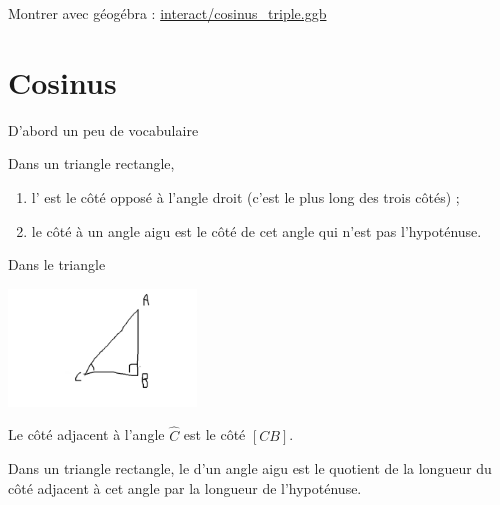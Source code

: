


Montrer avec géogébra : \url{interact/cosinus_triple.ggb}

\section{Cosinus}

D'abord un peu de vocabulaire

\begin{definition}
Dans un triangle rectangle,
\begin{enumerate}
    \item
        l' est le côté opposé à l'angle droit (c'est le plus long des trois côtés) ;
\item
    le côté  à un angle aigu est le côté de cet angle qui n'est pas l'hypoténuse.
\end{enumerate}
\end{definition}

\begin{example}
    Dans le triangle
    \begin{center}
        \includegraphics[width=5cm]{faux_ex_adj.pdf}
    \end{center}
    Le côté adjacent à l'angle \( \hat C\) est le côté \( [CB]\).
\end{example}

\begin{definition}
    Dans un triangle rectangle, le  d'un angle aigu est le quotient de la longueur du côté adjacent à cet angle par la longueur de l'hypoténuse.
\end{definition}

